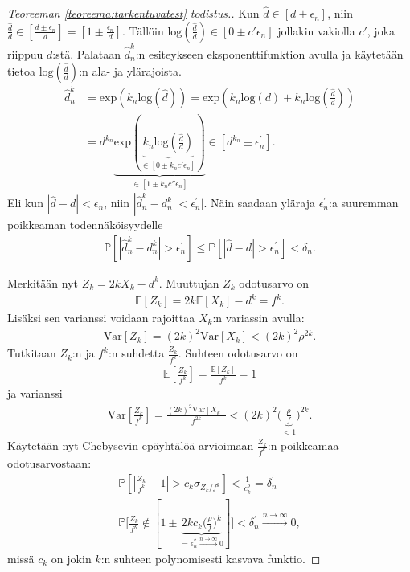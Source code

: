 \documentclass[finnish,12pt,a4paper,pdftex,sci,utf8]{aaltothesis}
\begin{document}
\begin{proof}[Teoreeman \ref{teoreema:tarkentuvatest} todistus.]
	Kun $\hat{d} \in [d \pm \epsilon_{n}^{}]$, niin $\frac{\hat{d}}{d} \in [\frac{d \pm \epsilon_{n}^{}}{d}] = [1 \pm \frac{\epsilon_{n}^{}}{d}]$. Tällöin $\text{log}(\frac{\hat{d}}{d}) \in [0 \pm c'\epsilon_{n}^{}]$ jollakin vakiolla $c'$, joka riippuu $d$:stä.
	Palataan $\hat{d}^k_n$:n esiteykseen eksponenttifunktion avulla ja käytetään tietoa $\text{log}(\frac{\hat{d}}{d})$:n ala- ja ylärajoista.
	\begin{align*}
		\hat{d}^k_n &= \text{exp}(k_n \text{log}(\hat{d})) = \text{exp}(k_n\text{log}(d) + k_n \text{log}(\frac{\hat{d}}{d})) \\
		&= d^{k_n} \underbrace{\text{exp}(\underbrace{k_n \text{log}(\frac{\hat{d}}{d})}_{\in [0 \pm k_n c' \epsilon_{n}^{}]})}_{\in [1 \pm k_n c'' \epsilon_{n}^{}]} \in [d^{k_n} \pm \epsilon_{n}^{'}].
	\end{align*}
	Eli  kun $|\hat{d} - d| < \epsilon_{n}^{}$, niin $|\hat{d}^k_n - d^k_n| < \epsilon_{n}^{'}|$. Näin saadaan yläraja $\epsilon_{n}^{'}$:a suuremman poikkeaman todennäköisyydelle 
	\begin{align*}
		\mathbb{P}[|\hat{d}^k_n - d^k_n| > \epsilon_{n}^{'}] \leq \mathbb{P}[|\hat{d} - d| > \epsilon_{n}^{'}] < \delta_n.
	\end{align*}

	Merkitään nyt $Z_k = 2k X_k - d^k$. Muuttujan $Z_k$ odotusarvo on 
	\begin{align*}
		\mathbb{E}[Z_k] = 2k \mathbb{E}[X_k] - d^k = f^k.
	\end{align*}
	Lisäksi sen varianssi voidaan rajoittaa $X_k$:n variassin avulla: 
	\begin{align*}
		\text{Var}[Z_k] = (2k)^2\text{Var}[X_k] < (2k)^2 \rho^{2k}.
	\end{align*}
	Tutkitaan $Z_k$:n ja $f^k$:n suhdetta $\frac{Z_k}{f^k}$. Suhteen odotusarvo on
	\begin{align*}
		\mathbb{E}[\frac{Z_k}{f^k}] = \frac{\mathbb{E}[Z_k]}{f^k} = 1
	\end{align*}
	ja varianssi
	\begin{align*}
		\text{Var}[\frac{Z_k}{f^k}] = \frac{(2k)^2 \text{Var}[X_k]}{f^{2k}} < (2k)^{2} \big(\underbrace{\frac{\rho}{f} }_{ < 1}\big)^{2k}.
	\end{align*}
	Käytetään nyt Chebysevin epäyhtälöä arvioimaan $\frac{Z_k}{f^k}$:n poikkeamaa odotusarvostaan:
	\begin{align*}
		\mathbb{P}[|\frac{Z_k}{f^k} - 1| > c_k \sigma_{Z_k/f^k}] < \frac{1}{c_k^2}  = \delta_{n}^{'} \\
		\mathbb{P} \big[\frac{Z_k}{f^k} \notin [1 \pm \underbrace{2 k c_k \big( \frac{\rho}{f}\big)^k}_{= \epsilon_{n}^{''} \xrightarrow{n \rightarrow \infty} 0}] \big] < \delta_{n}^{'} \xrightarrow{n \rightarrow \infty} 0,
	\end{align*}
	missä $c_k$ on jokin $k$:n suhteen polynomisesti kasvava funktio.


\end{proof}
\end{document}
